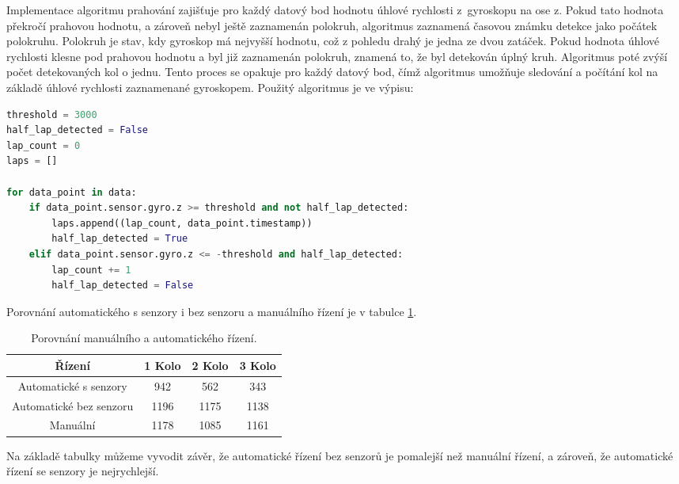 Implementace algoritmu prahování zajišťuje pro každý datový bod hodnotu úhlové
rychlosti z~gyroskopu na ose z. Pokud tato hodnota překročí prahovou hodnotu, a
zároveň nebyl ještě zaznamenán polokruh, algoritmus zaznamená časovou známku detekce
jako počátek polokruhu. Polokruh je stav, kdy gyroskop má nejvyšší hodnotu, což z pohledu drahý je jedna ze dvou zatáček. Pokud hodnota úhlové rychlosti klesne pod prahovou hodnotu a
byl již zaznamenán polokruh, znamená to, že byl detekován úplný kruh. Algoritmus
poté zvýší počet detekovaných kol o jednu. Tento proces se opakuje pro každý datový
bod, čímž algoritmus umožňuje sledování a počítání kol na základě úhlové rychlosti
zaznamenané gyroskopem. Použitý algoritmus je ve výpisu:
\begin{lstlisting}[language = python, caption = Počet kol, label = lst:countLap]
threshold = 3000
half_lap_detected = False
lap_count = 0
laps = []

for data_point in data:
    if data_point.sensor.gyro.z >= threshold and not half_lap_detected:
        laps.append((lap_count, data_point.timestamp))
        half_lap_detected = True
    elif data_point.sensor.gyro.z <= -threshold and half_lap_detected:
        lap_count += 1
        half_lap_detected = False
\end{lstlisting}

Porovnání automatického s senzory i bez senzoru a manuálního řízení je v tabulce \ref{tab:Comparison}.
\begin{table}[!h]
    \centering
    \begin{tabular}{cccc}
        \hline
        \textbf{Řízení} & \textbf{1 Kolo} & \textbf{2 Kolo} & \textbf{3 Kolo} \\
        \hline
        Automatické s senzory          & 942       & 562 & 343          \\
        Automatické bez senzoru & 1196 & 1175 & 1138 \\
        Manuální 			  & 1178       & 1085 & 1161           \\
        \hline
    \end{tabular}
    \caption{Porovnání manuálního a automatického řízení.}
    \label{tab:Comparison}
\end{table}

Na základě tabulky můžeme vyvodit závěr, že automatické řízení bez senzorů je pomalejší než manuální řízení, a zároveň, že automatické řízení se senzory je nejrychlejší.

\endinput
